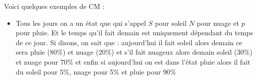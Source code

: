 \begin{exemple}
Voici quelques exemples de CM : 
    \begin{itemize}
        \item[Méteo :] Tous les jours on a un état que qui s'appel $S$ pour soleil $N$ pour nuage et $p$ pour pluie. Et le temps qu'il fait demain est uniquement dépendant du temps de ce jour. Si disons, on sait que : aujourd'hui il fait soleil alors demain ce sera pluie (80\%) et nuage (20\%) et s'il fait nuageux alors demain soleil (30\%) et nuage pour 70\% et enfin si aujourd'hui on est dans l'état pluie  alors il fait du soleil pour 5\%, nuage pour 5\% et pluie pour 90\%
        
\begin{center}



\begin{tikzpicture}[x=0.75pt,y=0.75pt,yscale=-1,xscale=1]


\end{tikzpicture}
\end{center}
\end{itemize}
\end{exemple}
